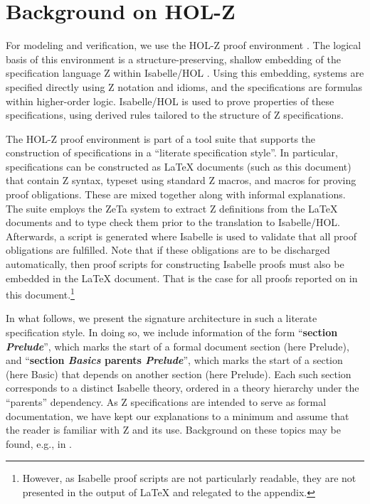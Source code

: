 \documentclass[a4paper,pdftex]{article}
\newcommand{\sigsys}{signature architecture}
\begin{document}
\section{Background on HOL-Z} \label{background-sec}

For modeling and verification, we use the HOL-Z proof environment
\cite{brucker.ea:hol-z:2003}.  The logical basis of this environment
is a structure-preserving, shallow embedding of the specification
language Z within Isabelle/HOL \cite{Paulson94}.   Using this
embedding, systems are specified directly using Z notation and idioms,
and the specifications are formulas within higher-order logic.
Isabelle/HOL is used to prove
properties of these specifications, using derived rules 
tailored to the structure of Z specifications.

The HOL-Z proof environment is part of a tool suite that supports the construction
of specifications in a ``literate specification style''.  In
particular, specifications can be constructed as \LaTeX{} documents
(such as this document) that contain Z syntax, typeset using standard Z
macros, and macros for proving proof obligations.  These are
mixed together along with
informal explanations.  The suite employs the ZeTa system \cite{ZETA} to
extract Z definitions from the \LaTeX{} documents and to type check them 
prior to the translation to Isabelle/HOL.
Afterwards, a script is generated where
Isabelle is used to validate that all proof obligations are fulfilled.
Note that if these obligations are to be discharged automatically, 
then proof scripts for constructing Isabelle proofs must also be embedded in
the \LaTeX{} document.  That is the case for all proofs reported
on in this document.\footnote{However, as Isabelle proof scripts are
not particularly readable, they are not presented in the output
of \LaTeX{} and relegated to the appendix.}

In what follows, we present the \sigsys{} in such a literate
specification style.  In doing so, we include information of the form
``{\bf section \emph{Prelude}}'',
which marks the start of a formal document
section (here Prelude), and ``{\bf section \emph{Basics} parents \emph{Prelude}}'',
which marks the start
of a section (here Basic) that depends on another section
(here Prelude).  Each such section corresponds to a distinct Isabelle
theory, ordered in a theory hierarchy under the ``parents'' dependency.
As Z specifications are intended to serve as formal
documentation, we have kept our explanations to a minimum and assume
that the reader is familiar with Z and its use.  Background on these
topics may be found, e.g., in \cite{jacky97,Zhandbook,WoodcockDavies96}.
\end{document}
